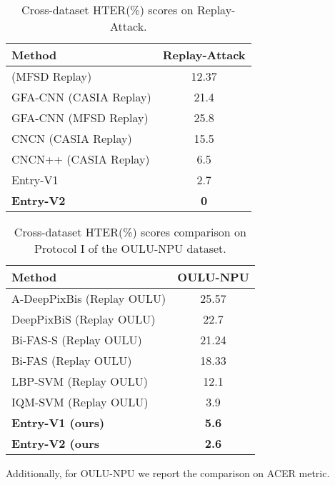 \documentclass[10pt,twocolumn,letterpaper]{article}
\begin{document}
\begin{table}[h]
  \centering
  \begin{tabular}{@{}lc@{}}
    \toprule
    \textbf{Method} & \textbf{Replay-Attack} \\
    \midrule
    \midrule
     (MFSD  Replay)\cite{CNN-LSTM} & 12.37 \\
    GFA-CNN (CASIA  Replay)\cite{GFA-CNN} & 21.4 \\
    GFA-CNN (MFSD  Replay)\cite{GFA-CNN} & 25.8 \\
    CNCN (CASIA  Replay)\cite{CDCNN} & 15.5 \\
    CNCN++ (CASIA  Replay)\cite{CDCNN} & 6.5 \\
    Entry-V1 & 2.7 \\
    \textbf{Entry-V2} & \textbf{0} \\
\bottomrule
  \end{tabular}
  \caption{Cross-dataset HTER(\%) scores on Replay-Attack\cite{mci/Chingovska2012}.}
  \label{tab:cross-test}
\end{table}

\begin{table}[h]
  \centering
  \begin{tabular}{@{}lc@{}}
    \toprule
    \textbf{Method} & \textbf{OULU-NPU} \\
    \midrule
    \midrule
    A-DeepPixBis (Replay  OULU)\cite{DeepPixBis} & 25.57 \\
    DeepPixBiS (Replay  OULU)\cite{DeepPix} & 22.7 \\
    Bi-FAS-S (Replay  OULU)\cite{Bi-FPNFAS} & 21.24 \\
    Bi-FAS (Replay  OULU)\cite{Bi-FPNFAS} & 18.33 \\
    LBP-SVM (Replay  OULU)\cite{DeepPix} & 12.1 \\
    IQM-SVM (Replay  OULU)\cite{IQM} & 3.9 \\
    \textbf{Entry-V1 (ours)} & \textbf{5.6} \\
    \textbf{Entry-V2 (ours} & \textbf{2.6} \\
    \bottomrule
  \end{tabular}
  \caption{Cross-dataset HTER(\%) scores comparison on Protocol I of the OULU-NPU dataset.}
  \label{tab:cross-test}
\end{table}

Additionally, for OULU-NPU we report the comparison on ACER metric.
\end{document}
